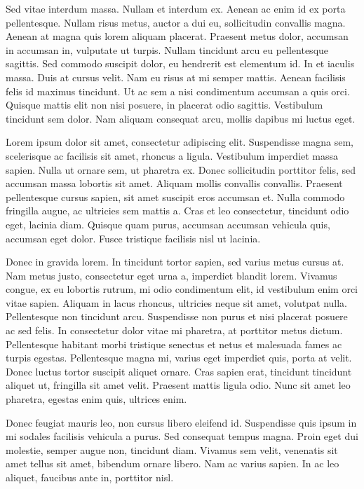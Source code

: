 \documentclass[a4paper,twoside,notitlepage,openright,11pt]{report}
\begin{document}
Sed vitae interdum massa. Nullam et interdum ex. Aenean ac enim id ex porta pellentesque. Nullam risus metus, auctor a dui eu, sollicitudin convallis magna. Aenean at magna quis lorem aliquam placerat. Praesent metus dolor, accumsan in accumsan in, vulputate ut turpis. Nullam tincidunt arcu eu pellentesque sagittis. Sed commodo suscipit dolor, eu hendrerit est elementum id. In et iaculis massa. Duis at cursus velit. Nam eu risus at mi semper mattis. Aenean facilisis felis id maximus tincidunt. Ut ac sem a nisi condimentum accumsan a quis orci. Quisque mattis elit non nisi posuere, in placerat odio sagittis. Vestibulum tincidunt sem dolor. Nam aliquam consequat arcu, mollis dapibus mi luctus eget.

Lorem ipsum dolor sit amet, consectetur adipiscing elit. Suspendisse magna sem, scelerisque ac facilisis sit amet, rhoncus a ligula. Vestibulum imperdiet massa sapien. Nulla ut ornare sem, ut pharetra ex. Donec sollicitudin porttitor felis, sed accumsan massa lobortis sit amet. Aliquam mollis convallis convallis. Praesent pellentesque cursus sapien, sit amet suscipit eros accumsan et. Nulla commodo fringilla augue, ac ultricies sem mattis a. Cras et leo consectetur, tincidunt odio eget, lacinia diam. Quisque quam purus, accumsan accumsan vehicula quis, accumsan eget dolor. Fusce tristique facilisis nisl ut lacinia.

Donec in gravida lorem. In tincidunt tortor sapien, sed varius metus cursus at. Nam metus justo, consectetur eget urna a, imperdiet blandit lorem. Vivamus congue, ex eu lobortis rutrum, mi odio condimentum elit, id vestibulum enim orci vitae sapien. Aliquam in lacus rhoncus, ultricies neque sit amet, volutpat nulla. Pellentesque non tincidunt arcu. Suspendisse non purus et nisi placerat posuere ac sed felis. In consectetur dolor vitae mi pharetra, at porttitor metus dictum. Pellentesque habitant morbi tristique senectus et netus et malesuada fames ac turpis egestas. Pellentesque magna mi, varius eget imperdiet quis, porta at velit. Donec luctus tortor suscipit aliquet ornare. Cras sapien erat, tincidunt tincidunt aliquet ut, fringilla sit amet velit. Praesent mattis ligula odio. Nunc sit amet leo pharetra, egestas enim quis, ultrices enim.

Donec feugiat mauris leo, non cursus libero eleifend id. Suspendisse quis ipsum in mi sodales facilisis vehicula a purus. Sed consequat tempus magna. Proin eget dui molestie, semper augue non, tincidunt diam. Vivamus sem velit, venenatis sit amet tellus sit amet, bibendum ornare libero. Nam ac varius sapien. In ac leo aliquet, faucibus ante in, porttitor nisl.
\end{document}
